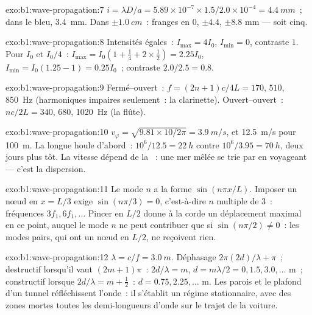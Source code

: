 \begin{solution}{exo:b1:wave-propagation:7}
$i = \lambda D/a = 5.89\times10^{-7} \times 1.5/2.0\times10^{-4} =
\qty{4.4}{mm}$~; dans le bleu, \qty{3.4}{mm}. Dans $\pm\qty{1.0}{cm}$~:
franges en $0$, $\pm 4.4$, $\pm 8.8$ mm --- soit cinq.
\end{solution}

\begin{solution}{exo:b1:wave-propagation:8}
Intensités égales~: $I_{\max} = 4I_0$, $I_{\min} = 0$, contraste $1$. Pour $I_0$ et $I_0/4$~:
$I_{\max} = I_0(1 + \tfrac14 + 2 \times \tfrac12) = 2.25I_0$, $I_{\min} =
I_0(1.25 - 1) = 0.25I_0$~; contraste $2.0/2.5 = 0.8$.
\end{solution}

\begin{solution}{exo:b1:wave-propagation:9}
Fermé--ouvert~: $f = (2n + 1)c/4L = 170$, $510$, \qty{850}{Hz}
(harmoniques impaires seulement~: la clarinette). Ouvert--ouvert~:
$nc/2L = 340$, $680$, \qty{1020}{Hz} (la flûte).
\end{solution}

\begin{solution}{exo:b1:wave-propagation:10}
$v_\varphi = \sqrt{9.81 \times 10/2\pi} = \qty{3.9}{m/s}$, et
\qty{12.5}{m/s} pour \qty{100}{m}. La longue houle d'abord~: $10^6/12.5 =
\qty{22}{h}$ contre $10^6/3.95 = \qty{70}{h}$, deux jours plus tôt. La
vitesse dépend de la ~: une mer mêlée se trie par
 en voyageant --- c'est la dispersion.
\end{solution}

\begin{solution}{exo:b1:wave-propagation:11}
Le mode $n$ a la forme $\sin(n\pi x/L)$. Imposer un nœud en $x = L/3$
exige $\sin(n\pi/3) = 0$, c'est-à-dire $n$ multiple de $3$~: fréquences $3f_1,
6f_1, \dots$ Pincer en $L/2$ donne à la corde un déplacement maximal en
ce point, auquel le mode $n$ ne peut contribuer que si $\sin(n\pi/2) \neq 0$~:
les modes pairs, qui ont un nœud en $L/2$, ne reçoivent rien.
\end{solution}

\begin{solution}{exo:b1:wave-propagation:12}
$\lambda = c/f = \qty{3.0}{m}$. Déphasage $2\pi(2d)/\lambda + \pi$~;
destructif lorsqu'il vaut $(2m + 1)\pi$~: $2d/\lambda = m$,
$d = m\lambda/2 = 0, 1.5, 3.0, \dots$ m~; constructif lorsque $2d/\lambda =
m + \tfrac12$~: $d = 0.75, 2.25, \dots$ m. Les parois et le plafond d'un
tunnel réfléchissent l'onde~: il s'établit un régime stationnaire, avec
des zones mortes toutes les demi-longueurs d'onde sur le trajet de la voiture.
\end{solution}

